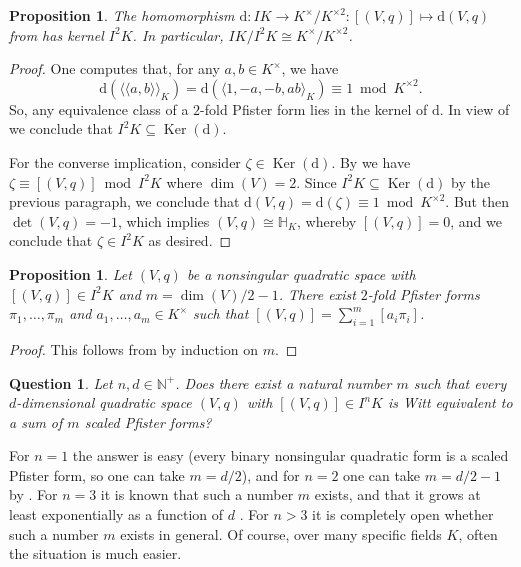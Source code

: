 \documentclass[12pt, leqno, british]{amsart}
\theoremstyle{definition}
\theoremstyle{plain}
\newtheorem{prop}[defi]{Proposition}
\newtheorem{ques}[defi]{Question}
\theoremstyle{remark}
\newcommand{\mbb}{\mathbb}
\newcommand{\nat}{\mbb N}
\DeclareMathOperator{\Ker}{Ker}
\newcommand{\disc}{\mathrm{d}}
\newcommand{\llangle}{\langle\!\langle}
\newcommand{\rrangle}{\rangle\!\rangle}
\begin{document}
\begin{prop}
The homomorphism
$\disc : IK \to K^\times/K^{\times 2} : [(V, q)] \mapsto \disc(V, q)$ from  has kernel $I^2 K$.
In particular, $IK/I^2K \cong K^\times / K^{\times 2}$.
\end{prop}
\begin{proof}
One computes that, for any $a, b \in K^\times$, we have
$$ \disc(\llangle a, b \rrangle_K) = \disc(\langle 1, -a, -b, ab \rangle_K) \equiv 1 \bmod K^{\times 2}.$$
So, any equivalence class of a $2$-fold Pfister form lies in the kernel of $\disc$.
In view of  we conclude that $I^2K \subseteq \Ker(\disc)$.

For the converse implication, consider $\zeta \in \Ker(\disc)$.
By  we have $\zeta \equiv [(V, q)] \bmod I^2K$ where $\dim(V) = 2$.
Since $I^2K \subseteq \Ker(\disc)$ by the previous paragraph, we conclude that $\disc(V, q) = \disc(\zeta) \equiv 1 \bmod K^{\times 2}$.
But then $\det(V, q) = -1$, which implies $(V, q) \cong \mbb{H}_K$, whereby $[(V, q)] = 0$, and we conclude that $\zeta \in I^2K$ as desired.
\end{proof}

\begin{prop}\label{P:boundI2}
Let $(V, q)$ be a nonsingular quadratic space with $[(V, q)] \in I^2K$ and $m = \dim(V)/2 - 1$.
There exist $2$-fold Pfister forms $\pi_1, \ldots, \pi_m$ and $a_1, \ldots, a_m \in K^\times$ such that
$ [(V, q)] = \sum_{i=1}^m [a_i\pi_i] $.
\end{prop}
\begin{proof}
This follows from  by induction on $m$.
\end{proof}
\begin{ques}\label{Q:boundIn}
Let $n, d \in \nat^+$.
Does there exist a natural number $m$ such that every $d$-dimensional quadratic space $(V, q)$ with $[(V, q)] \in I^n K$ is Witt equivalent to a sum of $m$ scaled Pfister forms?
\end{ques}
For $n = 1$ the answer is easy (every binary nonsingular quadratic form is a scaled Pfister form, so one can take $m = d/2$), and for $n = 2$ one can take $m = d/2 - 1$ by .
For $n = 3$ it is known that such a number $m$ exists, and that it grows at least exponentially as a function of $d$ \autocite{EssentialDimensionI3K}.
For $n > 3$ it is completely open whether such a number $m$ exists in general.
Of course, over many specific fields $K$, often the situation is much easier.
\end{document}
